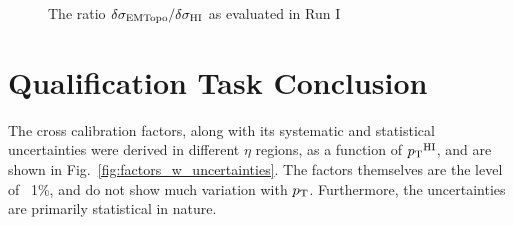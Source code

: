 \begin{figure}
	\centering
	\caption{The ratio $\delta\sigma_{\text{EMTopo}} / \delta\sigma_{\mathrm{HI}}$ as evaluated in Run I \cite{xcalib_run1}}
	\label{fig:run1_jer_uncert}%
\end{figure}


\section{Qualification Task Conclusion}
\label{sec:qual_result}
The cross calibration factors, along with its systematic and statistical uncertainties were derived in different $\eta$ regions, as a function of $\mbox{$p_{\mathrm{T}}$}^{\mathrm{HI}}$, and are shown in Fig.~\ref{fig:factors_w_uncertainties}. The factors themselves are the level of ~1\%, and do not show much variation with $\mbox{$p_{\mathrm{T}}$}$.  Furthermore, the uncertainties are primarily statistical in nature. 

